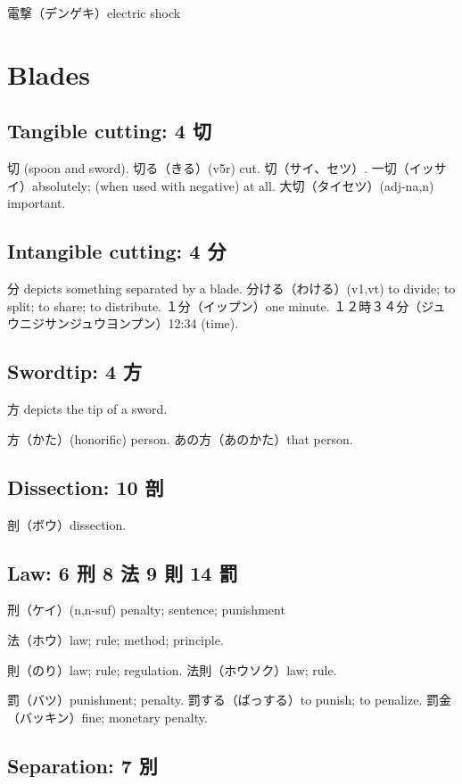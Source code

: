 電撃（デンゲキ）electric shock

\section{Blades}

\subsection{Tangible cutting: 4 切}

切 (spoon and sword).
切る（きる）(v5r) cut.
切（サイ、セツ）.
一切（イッサイ）absolutely; (when used with negative) at all.
大切（タイセツ）(adj-na,n) important.

\subsection{Intangible cutting: 4 分}

分 depicts something separated by a blade.
分ける（わける）(v1,vt) to divide; to split; to share; to distribute.
１分（イップン）one minute.
１２時３４分（ジュウニジサンジュウヨンプン）12:34 (time).

\subsection{Swordtip: 4 方}

方 depicts the tip of a sword.

方（かた）(honorific) person.
あの方（あのかた）that person.

\subsection{Dissection: 10 剖}

剖（ボウ）dissection.

\subsection{Law: 6 刑 8 法 9 則 14 罰}

刑（ケイ）(n,n-suf) penalty; sentence; punishment

法（ホウ）law; rule; method; principle.

則（のり）law; rule; regulation.
法則（ホウソク）law; rule.

罰（バツ）punishment; penalty.
罰する（ばっする）to punish; to penalize.
罰金（バッキン）fine; monetary penalty.

\subsection{Separation: 7 別}

